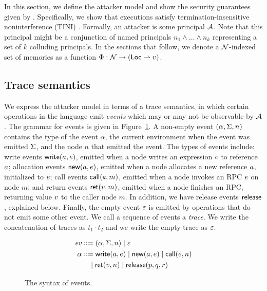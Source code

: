 In this section, we define the attacker model and show the security guarantees given by \lang. Specifically, we show that \lang{} executions satisfy termination-insensitive noninterference (TINI) \cite{4223226}. Formally, an attacker is some principal $\mathcal{A}$. Note that this principal might be a conjunction of named principals $n_1 \wedge \dots \wedge n_k$ representing a set of $k$ colluding principals. In the sections that follow, we denote a $\mathcal{N}$-indexed set of memories as a function $\Phi: \mathcal{N} \to (\mathsf{Loc} \rightharpoonup v)$.

\subsection{Trace semantics}
We express the attacker model in terms of a trace semantics, in which certain operations in the language emit \emph{events} which may or may not be observable by $\mathcal{A}$. The grammar for events is given in Figure~\ref{fig:event-syntax}. A non-empty event $(\alpha, \Sigma, n)$ contains the type of the event $\alpha$, the current environment when the event was emitted $\Sigma$, and the node $n$ that emitted the event. The types of events include: write events $\mathsf{write}(a, e)$, emitted when a node writes an expression $e$ to reference $a$; allocation events $\mathsf{new}(a, e)$, emitted when a node allocates a new reference $a$, initialized to $e$; call events $\mathsf{call}(e, m)$, emitted when a node invokes an RPC $e$ on node $m$; and return events $\mathsf{ret}(v, m)$, emitted when a node finishes an RPC, returning value $v$ to the caller node $m$. In addition, we have release events $\mathsf{release}$, explained below. Finally, the empty event $\varepsilon$ is emitted by operations that do not emit some other event. We call a sequence of events a \emph{trace}. We write the concatenation of traces as $t_1 \cdot t_2$ and we write the empty trace as $\varepsilon$.

\begin{figure}
\centering
\begin{align*}
\mathit{ev} &\vcentcolon\vcentcolon= (\alpha, \Sigma, n) \mid \varepsilon\\
\alpha &\vcentcolon\vcentcolon= \mathsf{write}(a, e) \mid \mathsf{new}(a, e) \mid \mathsf{call}(e, n) \\ &\quad \mid \mathsf{ret}(v, n) \mid \mathsf{release}(p, q, r)
\end{align*}
\caption{The syntax of events.}
\label{fig:event-syntax}
\end{figure}

